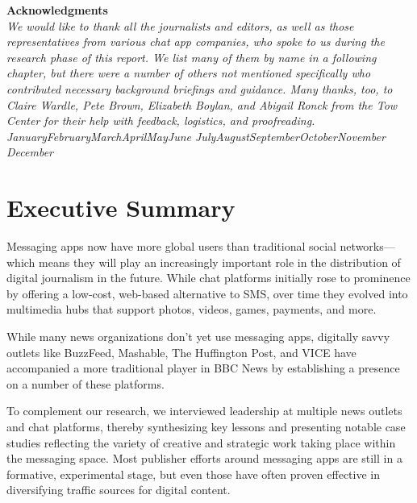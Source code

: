 \documentclass[notoc, symmetric, nobib, nols]{towcenter-guideto-book}
\newcommand{\monthyear}{%
  \ifcase\month\or January\or February\or March\or April\or May\or June\or
  July\or August\or September\or October\or November\or
  December\fi\space\number\year
}
\newcommand{\blankpage}{\newpage\hbox{}\thispagestyle{empty}\newpage}
\begin{document}
\blankpage
\blankpage


\null
\begin{fullwidth}
\noindent\textsf{\textbf{Acknowledgments}} \\[0.3cm]
\noindent\textit{We would like to thank all the journalists and editors, as well as those representatives from various chat app companies, who spoke to us during the research phase of this report. We list many of them by name in a following chapter, but there were a number of others not mentioned specifically who contributed necessary background briefings and guidance. Many thanks, too, to Claire Wardle, Pete Brown, Elizabeth Boylan, and Abigail Ronck from the Tow Center for their help with feedback, logistics, and proofreading.
}\\[0.1cm]
\noindent\textit{\monthyear}
\end{fullwidth}
\tableofcontents


\cleardoublepage


\mainmatter


\chapter{Executive Summary}
\blankpage

\noindent Messaging apps now have more global users than traditional social networks---which means they will play an increasingly important role in the distribution of digital journalism in the future. While chat platforms initially rose to prominence by offering a low-cost, web-based alternative to SMS, over time they evolved into multimedia hubs that support photos, videos, games, payments, and more.

While many news organizations don't yet use messaging apps, digitally savvy outlets like BuzzFeed, Mashable, The Huffington Post, and VICE have accompanied a more traditional player in BBC News by establishing a presence on a number of these platforms.


To complement our research, we interviewed leadership at multiple news outlets and chat platforms, thereby synthesizing key lessons and presenting notable case studies reflecting the variety of creative and strategic work taking place within the messaging space. Most publisher efforts around messaging apps are still in a formative, experimental stage, but even those have often proven effective in diversifying traffic sources for digital content.  
\end{document}

